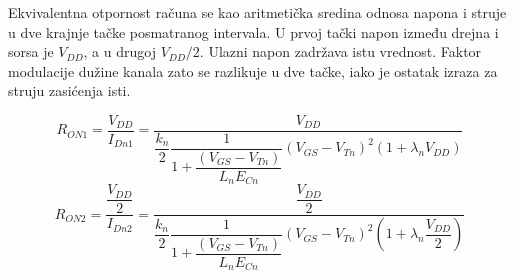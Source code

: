 Ekvivalentna otpornost računa se kao aritmetička sredina odnosa napona i struje u dve krajnje tačke posmatranog intervala. U prvoj tački napon između drejna i sorsa je $V_{DD}$, a u drugoj $V_{DD}/2$. Ulazni napon zadržava istu vrednost. Faktor modulacije dužine kanala zato se razlikuje u dve tačke, iako je ostatak izraza za struju zasićenja isti.

\[R_{ON1}=\dfrac{V_{DD}}{I_{Dn1}}=\dfrac{V_{DD}}{\dfrac{k_n}{2}\dfrac1{1+\dfrac{(V_{GS}-V_{Tn})}{L_nE_{Cn}}}(V_{GS}-V_{Tn})^2(1+\lambda_nV_{DD})}\]
\[R_{ON2}=\dfrac{\dfrac{V_{DD}}2}{I_{Dn2}}=\dfrac{\dfrac{V_{DD}}2}{\dfrac{k_n}{2}\dfrac1{1+\dfrac{(V_{GS}-V_{Tn})}{L_nE_{Cn}}}(V_{GS}-V_{Tn})^2\left(1+\lambda_n\dfrac{V_{DD}}2\right)}\]

